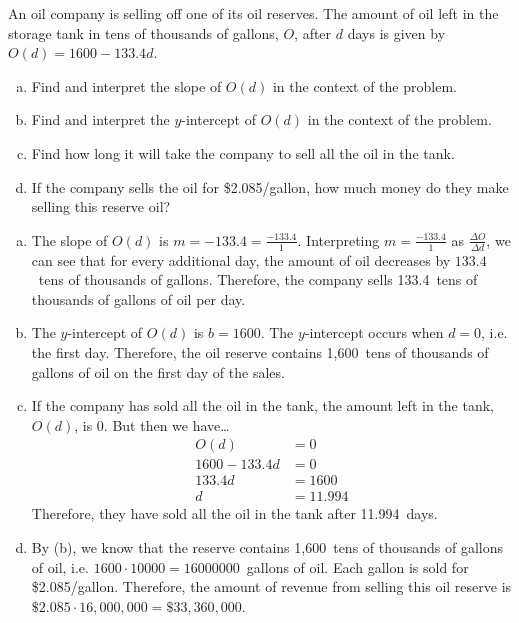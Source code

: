 \documentclass[11pt,letterpaper]{article}
\begin{document}

 An oil company is selling off one of its oil reserves. The amount of oil left in the storage tank in tens of thousands of gallons, $O$, after $d$ days is given by $O(d)= 1600 - 133.4d$.
	\begin{enumerate}[(a)]
	\item Find and interpret the slope of $O(d)$ in the context of the problem.
	\item Find and interpret the $y$-intercept of $O(d)$ in the context of the problem.
	\item Find how long it will take the company to sell all the oil in the tank. 
	\item If the company sells the oil for \$2.085/gallon, how much money do they make selling this reserve oil?
	\end{enumerate} \pspace

\sol 
\begin{enumerate}[(a)]
\item The slope of $O(d)$ is $m= -133.4= \frac{-133.4}{1}$. Interpreting $m= \frac{-133.4}{1}$ as $\frac{\Delta O}{\Delta d}$, we can see that for every additional day, the amount of oil decreases by $133.4$~tens of thousands of gallons. Therefore, the company sells 133.4~tens of thousands of gallons of oil per day. \pspace

\item The $y$-intercept of $O(d)$ is $b= 1600$. The $y$-intercept occurs when $d= 0$, i.e. the first day. Therefore, the oil reserve contains 1,600~tens of thousands of gallons of oil on the first day of the sales. \pspace

\item If the company has sold all the oil in the tank, the amount left in the tank, $O(d)$, is 0. But then we have\dots
	\[
	\begin{aligned}
	O(d)&= 0 \\[0.3cm]
	1600 - 133.4d&= 0 \\[0.3cm]
	133.4d&= 1600 \\[0.3cm]
	d&= 11.994
	\end{aligned}
	\] 
Therefore, they have sold all the oil in the tank after 11.994~days. \pspace

\item By (b), we know that the reserve contains 1,600~tens of thousands of gallons of oil, i.e. $1600 \cdot 10000= 16000000$~gallons of oil. Each gallon is sold for \$2.085/gallon. Therefore, the amount of revenue from selling this oil reserve is $\$2.085 \cdot 16,000,000= \$33,360,000$. 
\end{enumerate}
\end{document}
